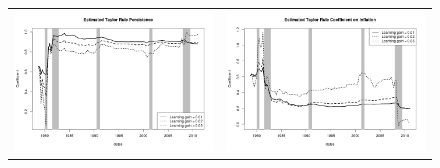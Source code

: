 \documentclass[12pt]{article}
\begin{document}
\begin{figure}
\begin{tabular}{cc}
\includegraphics[scale=0.4]{coef_persistence_iv.png} & \includegraphics[scale=0.4]{coef_inflation_iv.png} \\

\end{tabular}
\end{figure}
\end{document}
